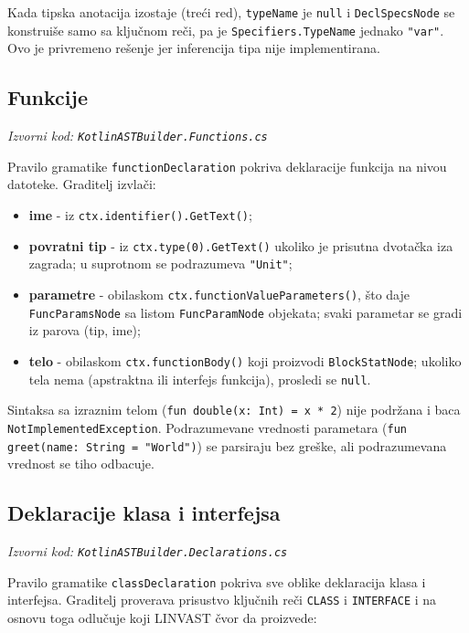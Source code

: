 \documentclass[a4paper]{article}
\begin{document}
\noindent
Kada tipska anotacija izostaje (treći red), \texttt{typeName} je \texttt{null} i
\texttt{DeclSpecsNode} se konstruiše samo sa ključnom reči, pa je
\texttt{Specifiers.TypeName} jednako \texttt{"var"}. Ovo je privremeno rešenje jer 
inferencija tipa nije implementirana.

\subsection{Funkcije}
\noindent\textit{Izvorni kod: \texttt{KotlinASTBuilder.Functions.cs}}
\medskip

Pravilo gramatike \texttt{functionDeclaration} pokriva deklaracije funkcija na
nivou datoteke. Graditelj izvlači:

\begin{itemize}
    \item \textbf{ime} - iz \texttt{ctx.identifier().GetText()};
    \item \textbf{povratni tip} - iz \texttt{ctx.type(0).GetText()} ukoliko je
          prisutna dvotačka iza zagrada; u suprotnom se podrazumeva \texttt{"Unit"};
    \item \textbf{parametre} - obilaskom \texttt{ctx.functionValueParameters()},
          što daje \texttt{FuncParamsNode} sa listom \texttt{FuncParamNode}
          objekata; svaki parametar se gradi iz parova (tip, ime);
    \item \textbf{telo} - obilaskom \texttt{ctx.functionBody()} koji proizvodi
          \texttt{BlockStatNode}; ukoliko tela nema (apstraktna ili interfejs
          funkcija), prosledi se \texttt{null}.
\end{itemize}

\begin{sloppypar}
Sintaksa sa izraznim telom (\texttt{fun double(x: Int) = x * 2}) nije
podržana i baca \texttt{NotImplementedException}. Podrazumevane vrednosti
parametara (\texttt{fun greet(name: String = "World")}) se parsiraju bez
greške, ali podrazumevana vrednost se tiho odbacuje.
\end{sloppypar}

\subsection{Deklaracije klasa i interfejsa}
\noindent\textit{Izvorni kod: \texttt{KotlinASTBuilder.Declarations.cs}}
\medskip

Pravilo gramatike \texttt{classDeclaration} pokriva sve oblike deklaracija klasa
i interfejsa. Graditelj proverava prisustvo ključnih reči \texttt{CLASS} i
\texttt{INTERFACE} i na osnovu toga odlučuje koji LINVAST čvor da proizvede:
\end{document}

